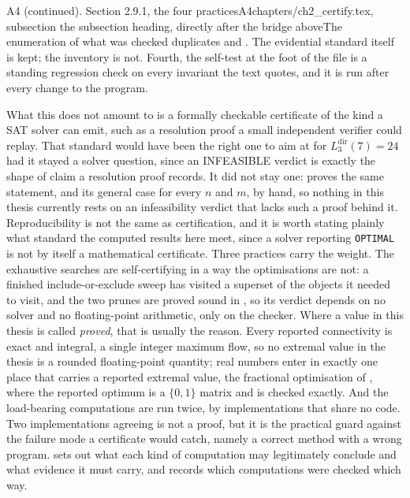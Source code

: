 \begin{offcutrewrite}{A4 (continued). Section 2.9.1, the four practices}{A4}{chapters/ch2\_certify.tex, subsection }{the subsection heading, directly after the bridge above}{The enumeration of what was checked duplicates  and . The evidential standard itself is kept; the inventory is not.}
Fourth, the self-test at the foot of the file is a standing regression check on every invariant the text quotes, and it is run after every change to the program.

What this does not amount to is a formally checkable certificate of the kind a SAT solver can emit, such as a resolution proof a small independent verifier could replay. That standard would have been the right one to aim at for $L_3^{\mathrm{dir}}(7) = 24$ had it stayed a solver question, since an INFEASIBLE verdict is exactly the shape of claim a resolution proof records. It did not stay one:  proves the same statement, and its general case for every $n$ and $m$, by hand, so nothing in this thesis currently rests on an infeasibility verdict that lacks such a proof behind it.
\nowreads
Reproducibility is not the same as certification, and it is worth stating plainly what standard the computed results here meet, since a solver reporting \texttt{OPTIMAL} is not by itself a mathematical certificate. Three practices carry the weight. The exhaustive searches are self-certifying in a way the optimisations are not: a finished include-or-exclude sweep has visited a superset of the objects it needed to visit, and the two prunes are proved sound in , so its verdict depends on no solver and no floating-point arithmetic, only on the checker. Where a value in this thesis is called \emph{proved}, that is usually the reason. Every reported connectivity is exact and integral, a single integer maximum flow, so no extremal value in the thesis is a rounded floating-point quantity; real numbers enter in exactly one place that carries a reported extremal value, the fractional optimisation of , where the reported optimum is a $\{0,1\}$ matrix and is checked exactly. And the load-bearing computations are run twice, by implementations that share no code. Two implementations agreeing is not a proof, but it is the practical guard against the failure mode a certificate would catch, namely a correct method with a wrong program.  sets out what each kind of computation may legitimately conclude and what evidence it must carry, and  records which computations were checked which way.


\end{offcutrewrite}
